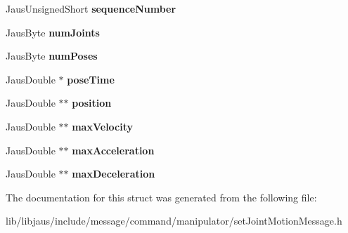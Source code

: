 \begin{DoxyCompactItemize}
\item 
\hypertarget{struct_set_joint_motion_message_struct_a0550d3e1808b7d442ebb725553618aba}{\-Jaus\-Unsigned\-Short {\bfseries sequence\-Number}}\label{struct_set_joint_motion_message_struct_a0550d3e1808b7d442ebb725553618aba}

\item 
\hypertarget{struct_set_joint_motion_message_struct_a8f97b1b46ef8c9306820f60db8858807}{\-Jaus\-Byte {\bfseries num\-Joints}}\label{struct_set_joint_motion_message_struct_a8f97b1b46ef8c9306820f60db8858807}

\item 
\hypertarget{struct_set_joint_motion_message_struct_a2c55a38ab540d7496b339409d9c47490}{\-Jaus\-Byte {\bfseries num\-Poses}}\label{struct_set_joint_motion_message_struct_a2c55a38ab540d7496b339409d9c47490}

\item 
\hypertarget{struct_set_joint_motion_message_struct_ada5318acd874a9cabe0c323d2a34ffac}{\-Jaus\-Double $\ast$ {\bfseries pose\-Time}}\label{struct_set_joint_motion_message_struct_ada5318acd874a9cabe0c323d2a34ffac}

\item 
\hypertarget{struct_set_joint_motion_message_struct_a1766e99022cf01d724591f43bbce45d8}{\-Jaus\-Double $\ast$$\ast$ {\bfseries position}}\label{struct_set_joint_motion_message_struct_a1766e99022cf01d724591f43bbce45d8}

\item 
\hypertarget{struct_set_joint_motion_message_struct_a62bc3b8ab1e68f66b65c89bab8e4a4c5}{\-Jaus\-Double $\ast$$\ast$ {\bfseries max\-Velocity}}\label{struct_set_joint_motion_message_struct_a62bc3b8ab1e68f66b65c89bab8e4a4c5}

\item 
\hypertarget{struct_set_joint_motion_message_struct_a3f073fb567dbb77763e9aa95e1250303}{\-Jaus\-Double $\ast$$\ast$ {\bfseries max\-Acceleration}}\label{struct_set_joint_motion_message_struct_a3f073fb567dbb77763e9aa95e1250303}

\item 
\hypertarget{struct_set_joint_motion_message_struct_a3edb73d95810deed6f829f4cb3009ece}{\-Jaus\-Double $\ast$$\ast$ {\bfseries max\-Deceleration}}\label{struct_set_joint_motion_message_struct_a3edb73d95810deed6f829f4cb3009ece}

\end{DoxyCompactItemize}


\-The documentation for this struct was generated from the following file\-:\begin{DoxyCompactItemize}
\item 
lib/libjaus/include/message/command/manipulator/set\-Joint\-Motion\-Message.\-h\end{DoxyCompactItemize}
